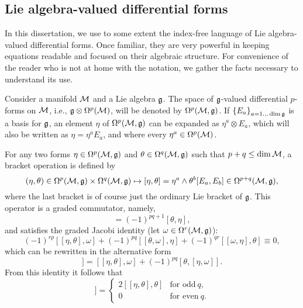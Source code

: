 \documentclass[
final,
11pt,
a4paper,
DIV=11,
headinclude=true,
footinclude=false,
bibliography=totoc,
twoside=true,  %
BCOR=5mm
]{scrbook}
\begin{document}
\newpage
\begin{subappendices}
\section{Lie algebra-valued differential forms}
\label{sapp:lie_alg_diff}

In this dissertation, we use to some extent the index-free 
language of Lie algebra-valued differential forms. Once familiar, 
they are very powerful in keeping equations readable and focused 
on their algebraic structure. For convenience of the reader who 
is not at home with the notation, we gather the facts necessary 
to understand its use.

Consider a manifold $\mathcal{M}$ and a Lie algebra $\mathfrak{g}$. The 
space of $\mathfrak{g}$-valued differential $p$-forms on $\mathcal{M}$, 
i.e., $\mathfrak{g} \otimes \Omega^p(\mathcal{M})$, will be denoted by 
$\Omega^p(\mathcal{M}, \mathfrak{g})$.  If ${\{E_a\}}_{a= 
  1\ldots\dim\mathfrak{g}}$ is a basis for $\mathfrak{g}$, an element $\eta$ 
of $\Omega^p(\mathcal{M}, \mathfrak{g})$ can be expanded as $\eta^a \otimes 
E_a$, which will also be written as $\eta = \eta^a E_a$, and 
where every $\eta^a \in \Omega^p(\mathcal{M})$.

For any two forms $\eta \in \Omega^p(\mathcal{M}, \mathfrak{g})$ and $ 
\theta \in \Omega^q(\mathcal{M}, \mathfrak{g})$ such that $p + q \leq \dim 
\mathcal{M}$, a bracket operation is defined by
\begin{equation*}
  (\eta,\theta) \in \Omega^p(\mathcal{M},\mathfrak{g}) \times 
  \Omega^q(\mathcal{M},\mathfrak{g}) \mapsto [\eta,\theta] = \eta^a \wedge 
  \theta^b [E_a,E_b] \in \Omega^{p+q}(\mathcal{M},\mathfrak{g}),
\end{equation*}
where the last bracket is of course just the ordinary Lie bracket 
of $\mathfrak{g}$. This operator is a graded commutator, namely,
\begin{equation*}
  [\eta,\theta] = {(-1)}^{pq+1} [\theta,\eta],
\end{equation*}
and satisfies the graded Jacobi identity (let $\omega \in 
\Omega^r(\mathcal{M},\mathfrak{g})$):
\begin{equation*}
  {(-1)}^{rp}[[\eta,\theta],\omega] 
  + {(-1)}^{pq}[[\theta,\omega],\eta] +
  {(-1)}^{qr}[[\omega,\eta],\theta] \equiv 0,
\end{equation*}
which can be rewritten in the alternative form
\begin{equation*}
  [\eta,[\theta,\omega]]
  = [[\eta,\theta],\omega]
  + {(-1)}^{pq} [\theta,[\eta,\omega]].
\end{equation*}
From this identity it follows that
\begin{equation*}
  [\eta,[\theta,\theta]] =
  \begin{cases}
    2 [[\eta,\theta],\theta] & \text{for odd}~q, \\
    0 & \text{for even}~q.
  \end{cases}
\end{equation*}


\end{subappendices}
\end{document}
